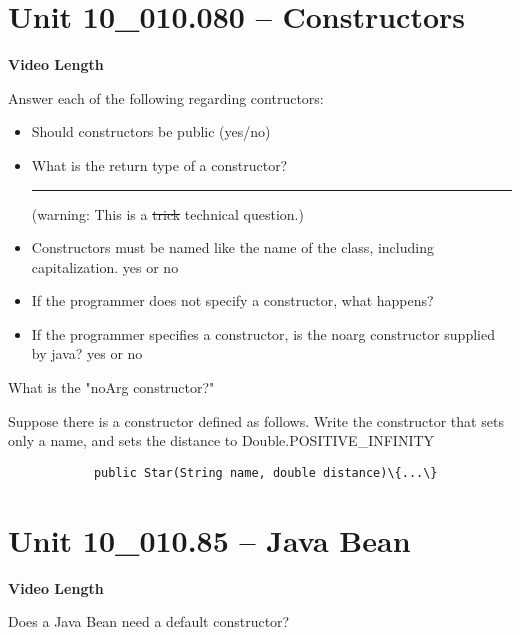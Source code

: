 \documentclass[letterpaper,12pt]{exam}
\newcommand{\unit}{Unit 10}
\begin{document}
\begin{questions}
\section*{\unit\_010.080 -- Constructors} 
\par{\selectfont\textbf{Video Length }}
\begin{samepage}
    \question Answer each of the following regarding contructors:
      \begin{itemize}
        \item Should constructors be public (yes/no)
        \vspace{5mm}
        \item What is the return type of a constructor? \rule{20mm}{0.35mm} (warning: This is a \st{trick} technical question.)
        \vspace{5mm}
        \item Constructors must be named like the name of the class, including capitalization. yes or no
        \vspace{5mm}
        \item If the programmer does not specify a constructor, what happens?
        \vspace{15mm}
        \item If the programmer specifies a constructor, is the noarg constructor supplied by java? yes or no
        \vspace{5mm}
       \end{itemize}
\end{samepage}

\begin{samepage}
    \question What is the "noArg constructor?"
    \vspace{5mm}
\end{samepage}

\begin{samepage}
    \question Suppose there is a constructor defined as follows.  Write the constructor that sets only a name, and sets the distance to Double.POSITIVE\_INFINITY
    \begin{verbatim}
            public Star(String name, double distance)\{...\}
    \end{verbatim}
    \vspace{5mm}
\end{samepage}


\section*{\unit\_010.85 -- Java Bean} 
\par{\selectfont\textbf{Video Length }}
\begin{samepage}
    \question Does a Java Bean need a default constructor?  
    \vspace{5mm}
\end{samepage}


\end{questions}
\end{document}
